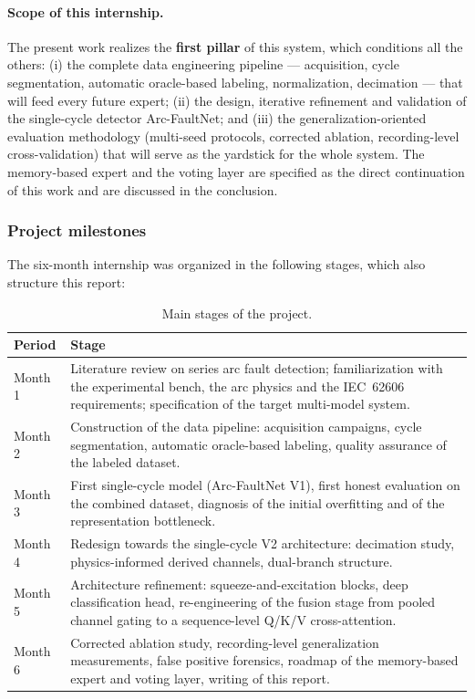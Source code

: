 \paragraph{Scope of this internship.} The present work realizes the \textbf{first pillar} of this system, which conditions all the others: (i) the complete data engineering pipeline --- acquisition, cycle segmentation, automatic oracle-based labeling, normalization, decimation --- that will feed every future expert; (ii) the design, iterative refinement and validation of the single-cycle detector Arc-FaultNet; and (iii) the generalization-oriented evaluation methodology (multi-seed protocols, corrected ablation, recording-level cross-validation) that will serve as the yardstick for the whole system. The memory-based expert and the voting layer are specified as the direct continuation of this work and are discussed in the conclusion.

\subsubsection{Project milestones}

The six-month internship was organized in the following stages, which also structure this report:

\begin{table}[H]
\centering
\caption{Main stages of the project.}
\label{tab:milestones}
\renewcommand{\arraystretch}{1.3}
\begin{tabular}{|P{1.6cm}|p{11.6cm}|}
\hline
\textbf{Period} & \textbf{Stage} \\
\hline
Month 1 & Literature review on series arc fault detection; familiarization with the experimental bench, the arc physics and the IEC~62606 requirements; specification of the target multi-model system. \\
\hline
Month 2 & Construction of the data pipeline: acquisition campaigns, cycle segmentation, automatic oracle-based labeling, quality assurance of the labeled dataset. \\
\hline
Month 3 & First single-cycle model (Arc-FaultNet V1), first honest evaluation on the combined dataset, diagnosis of the initial overfitting and of the representation bottleneck. \\
\hline
Month 4 & Redesign towards the single-cycle V2 architecture: decimation study, physics-informed derived channels, dual-branch structure. \\
\hline
Month 5 & Architecture refinement: squeeze-and-excitation blocks, deep classification head, re-engineering of the fusion stage from pooled channel gating to a sequence-level Q/K/V cross-attention. \\
\hline
Month 6 & Corrected ablation study, recording-level generalization measurements, false positive forensics, roadmap of the memory-based expert and voting layer, writing of this report. \\
\hline
\end{tabular}
\end{table}

